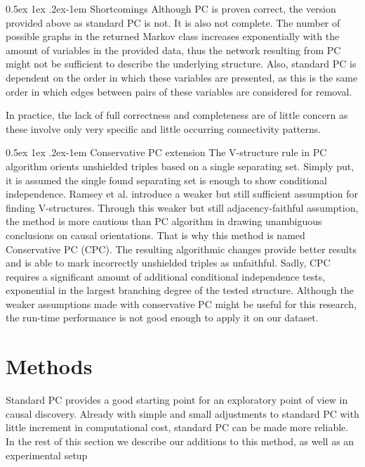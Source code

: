 \documentclass[a4paper, english]{article}
\makeatletter
\renewcommand{\paragraph}{%
  \@startsection{paragraph}{4}%
  {\z@}{0.5ex \@plus 1ex \@minus .2ex}{-1em}%
  {\normalfont\normalsize\bfseries}%
}
\makeatother
\begin{document}
\paragraph{Shortcomings}
Although PC is proven correct, the version provided above as standard PC is not.
It is also not complete.
The number of possible graphs in the returned Markov class increases exponentially with the amount of variables in the provided data, thus the network resulting from PC might not be sufficient to describe the underlying structure.
Also, standard PC is dependent on the order in which these variables are presented, as this is the same order in which edges between pairs of these variables are considered for removal\cite[p.88]{spirtes2000}.

In practice, the lack of full correctness and completeness are of little concern as these involve only very specific and little occurring connectivity patterns\cite[p.127-130]{spirtes2000}.

\paragraph{Conservative PC extension}
The V-structure rule in PC algorithm orients unshielded triples based on a single separating set. 
Simply put, it is assumed the single found separating set is enough to show conditional independence. 
Ramsey et al. \cite{ramsey2012} introduce a weaker but still sufficient assumption for finding V-structures.
Through this weaker but still adjacency-faithful assumption, the method is more cautious than PC algorithm in drawing unambiguous conclusions on causal orientations.
That is why this method is named Conservative PC (CPC).
The resulting algorithmic changes provide better results and is able to mark incorrectly unshielded triples as unfaithful.
Sadly, CPC requires a significant amount of additional conditional independence tests, exponential in the largest branching degree of the tested structure.
Although the weaker assumptions made with conservative PC might be useful for this research, the run-time performance is not good enough to apply it on our dataset.

\section{Methods}\label{sec:methods}%
Standard PC provides a good starting point for an exploratory point of view in causal discovery.
Already with simple and small adjustments to standard PC with little increment in computational cost, standard PC can be made more reliable.
In the rest of this section we describe our additions to this method, as well as an experimental setup
\end{document}
